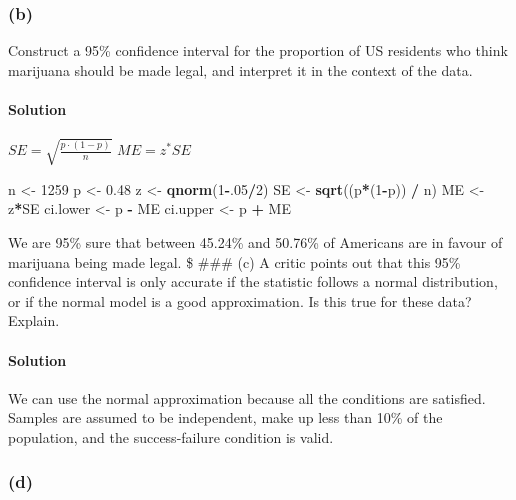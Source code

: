 \documentclass[]{article}
\newenvironment{Shaded}{\begin{snugshade}}{\end{snugshade}}
\newcommand{\KeywordTok}[1]{\textcolor[rgb]{0.13,0.29,0.53}{\textbf{#1}}}
\newcommand{\DecValTok}[1]{\textcolor[rgb]{0.00,0.00,0.81}{#1}}
\newcommand{\FloatTok}[1]{\textcolor[rgb]{0.00,0.00,0.81}{#1}}
\newcommand{\StringTok}[1]{\textcolor[rgb]{0.31,0.60,0.02}{#1}}
\newcommand{\OperatorTok}[1]{\textcolor[rgb]{0.81,0.36,0.00}{\textbf{#1}}}
\newcommand{\NormalTok}[1]{#1}
\let\oldparagraph\paragraph
\renewcommand{\paragraph}[1]{\oldparagraph{#1}\mbox{}}
\begin{document}
\subsubsection{(b)}\label{b-1}

Construct a 95\% confidence interval for the proportion of US residents
who think marijuana should be made legal, and interpret it in the
context of the data.

\paragraph{Solution}\label{solution-5}

\(SE = \sqrt{\frac{p\cdot(1-p)}{n}}\) \(ME = z^*SE\)

\begin{Shaded}
\begin{Highlighting}[]
\NormalTok{n <-}\StringTok{ }\DecValTok{1259}
\NormalTok{p <-}\StringTok{ }\FloatTok{0.48}
\NormalTok{z <-}\StringTok{ }\KeywordTok{qnorm}\NormalTok{(}\DecValTok{1}\OperatorTok{-}\NormalTok{.}\DecValTok{05}\OperatorTok{/}\DecValTok{2}\NormalTok{)}
\NormalTok{SE <-}\StringTok{ }\KeywordTok{sqrt}\NormalTok{((p}\OperatorTok{*}\NormalTok{(}\DecValTok{1}\OperatorTok{-}\NormalTok{p)) }\OperatorTok{/}\StringTok{ }\NormalTok{n)}
\NormalTok{ME <-}\StringTok{ }\NormalTok{z}\OperatorTok{*}\NormalTok{SE}
\NormalTok{ci.lower <-}\StringTok{ }\NormalTok{p }\OperatorTok{-}\StringTok{ }\NormalTok{ME}
\NormalTok{ci.upper <-}\StringTok{ }\NormalTok{p }\OperatorTok{+}\StringTok{ }\NormalTok{ME}
\end{Highlighting}
\end{Shaded}

We are 95\% sure that between 45.24\% and 50.76\% of Americans are in
favour of marijuana being made legal. \$ \#\#\# (c) A critic points out
that this 95\% confidence interval is only accurate if the statistic
follows a normal distribution, or if the normal model is a good
approximation. Is this true for these data? Explain.

\paragraph{Solution}\label{solution-6}

We can use the normal approximation because all the conditions are
satisfied. Samples are assumed to be independent, make up less than 10\%
of the population, and the success-failure condition is valid.

\subsubsection{(d)}\label{d-1}
\end{document}
